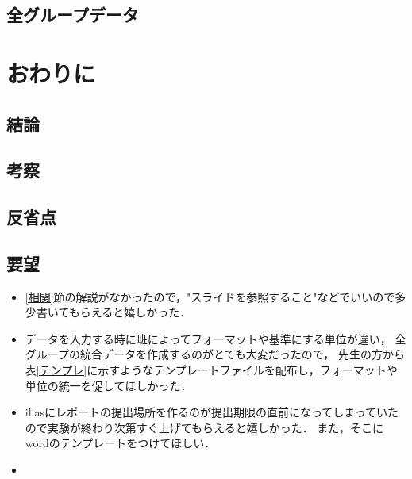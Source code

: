 \documentclass[titlepage,a4paper]{jsarticle}
\begin{document}
\subsection{全グループデータ}

\section{おわりに}
\subsection{結論}
\subsection{考察}
\subsection{反省点}

\subsection{要望}
\begin{itemize}
  \item \ref{相関}節の解説がなかったので，"スライドを参照すること"などでいいので多少書いてもらえると嬉しかった．
  \item データを入力する時に班によってフォーマットや基準にする単位が違い，
        全グループの統合データを作成するのがとても大変だったので，
        先生の方から表\ref{テンプレ}に示すようなテンプレートファイルを配布し，フォーマットや単位の統一を促してほしかった．
  \item iliasにレポートの提出場所を作るのが提出期限の直前になってしまっていたので実験が終わり次第すぐ上げてもらえると嬉しかった．
        また，そこにwordのテンプレートをつけてほしい．
  \item
\end{itemize}
\end{document}
